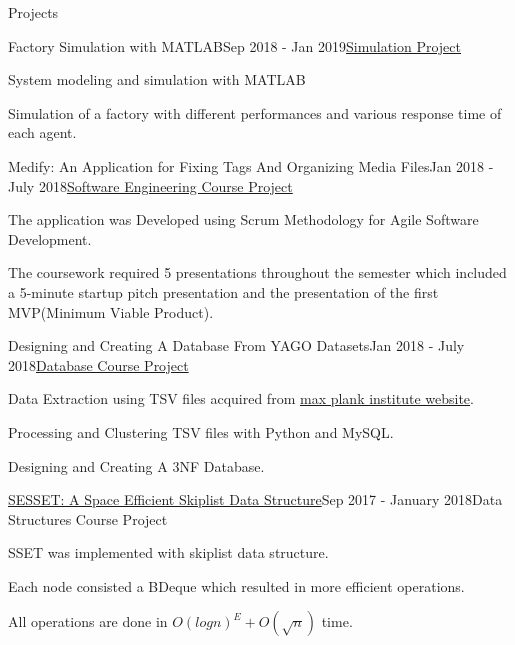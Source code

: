 \documentclass{resume} %
\begin{document}
	\begin{rSection}{Projects}

		\begin{rSubsection}{Factory Simulation with MATLAB}{Sep 2018 - Jan 2019}{\href{https://github.com/pouyaaghahoseini/System-Queueing-Simulation}{\textcolor{coolblack}{Simulation  Project}}}{ }
			\item System modeling and simulation with MATLAB
			\item Simulation of a factory with different performances and various response time of each agent.
			
			
		\end{rSubsection}
	
		\begin{rSubsection}{Medify: An Application for Fixing Tags And Organizing Media Files}{Jan 2018 - July 2018}{\href{https://github.com/pouyaaghahoseini/Medify}{\textcolor{coolblack}{Software Engineering Course Project}}}{ }
			
			\item The application was Developed using Scrum Methodology for Agile Software Development.
			\item The coursework required 5 presentations throughout the semester which included a 5-minute startup pitch presentation and the presentation of the first MVP(Minimum Viable Product).
		\end{rSubsection}
		
		\begin{rSubsection}{Designing and Creating A Database From YAGO Datasets}{Jan 2018 - July 2018}{\href{https://github.com/pouyaaghahoseini/Database-Course}{\textcolor{coolblack}{Database Course Project}}}{ }
			\item Data Extraction using TSV files acquired from \href{https://www.mpi-inf.mpg.de/departments/databases-and-information-systems/research/yago-naga/yago/downloads/}{max plank institute website}.
			\item Processing and Clustering TSV files with Python and MySQL.
			\item Designing and Creating A 3NF Database.
			
		\end{rSubsection}	
		
		
		\begin{rSubsection}{\href{https://github.com/pouyaaghahoseini/DS-Course/tree/master/SE-Skiplist}{\textcolor{coolblack}{SESSET: A Space Efficient Skiplist Data Structure}}}{Sep 2017 - January 2018}{Data Structures Course Project}{ }
			\item SSET‌ was implemented with skiplist data structure.
			\item Each node consisted a BDeque which resulted in more efficient operations.
			\item All operations are done in $O(logn)^{E} + O(\sqrt{n})$ time.
		\end{rSubsection}
		

\end{rSection}
\end{document}
